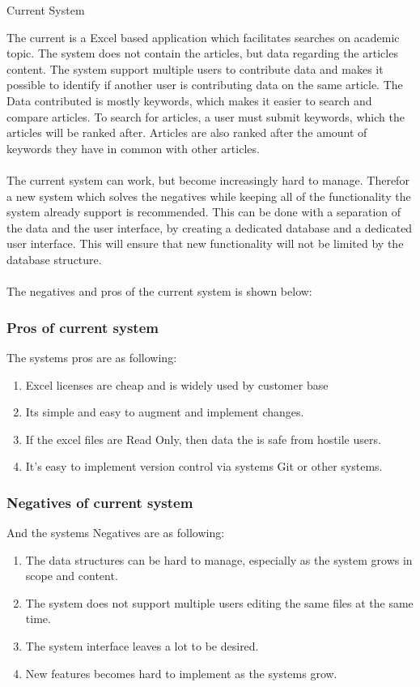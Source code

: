 \begin{section}{Current System}

The current is a Excel based application which facilitates searches on academic topic. The system does not contain the articles, but data regarding the articles content. 
The system support multiple users to contribute data and makes it possible to identify if another user is contributing data on the same article. The Data contributed is mostly keywords, which makes it easier to search and compare articles. 
To search for articles, a user must submit keywords, which the articles will be ranked after. Articles are also ranked after the amount of keywords they have in common with other articles. \\\\The current system can work, but become increasingly hard to manage. Therefor a new system which solves the negatives while keeping all of the functionality the system already support is recommended. This can be done with a separation of the data and the user interface, by creating a dedicated database and a dedicated user interface. This will ensure that new functionality will not be limited by the database structure. \\
\\The negatives and pros of the current system is shown below:
\subsubsection{Pros of current system}
The systems pros are as following:
\begin{enumerate}
	\item Excel licenses are cheap and is widely used by customer base
	\item Its simple and easy to augment and implement changes.
	\item If the excel files are Read Only, then data the is safe from hostile users.
	\item It's easy to implement version control via systems Git or other systems.
\end{enumerate}

\subsubsection{Negatives of current system} 
And the systems Negatives are as following: 
\begin{enumerate}
	\item The data structures can be hard to manage, especially as the system grows in scope and content.
	\item The system does not support multiple users editing the same files at the same time.
	\item The system interface leaves a lot to be desired.
	\item New features becomes hard to implement as the systems grow.
\end{enumerate}

\end{section}